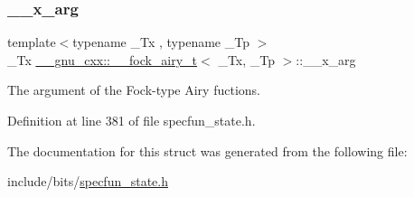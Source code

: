 \subsubsection{\texorpdfstring{\+\_\+\+\_\+x\+\_\+arg}{\_\_x\_arg}}
{\footnotesize\ttfamily template$<$typename \+\_\+\+Tx , typename \+\_\+\+Tp $>$ \\
\+\_\+\+Tx \hyperlink{struct____gnu__cxx_1_1____fock__airy__t}{\+\_\+\+\_\+gnu\+\_\+cxx\+::\+\_\+\+\_\+fock\+\_\+airy\+\_\+t}$<$ \+\_\+\+Tx, \+\_\+\+Tp $>$\+::\+\_\+\+\_\+x\+\_\+arg}



The argument of the Fock-\/type Airy fuctions. 



Definition at line 381 of file specfun\+\_\+state.\+h.



The documentation for this struct was generated from the following file\+:\begin{DoxyCompactItemize}
\item 
include/bits/\hyperlink{specfun__state_8h}{specfun\+\_\+state.\+h}\end{DoxyCompactItemize}
